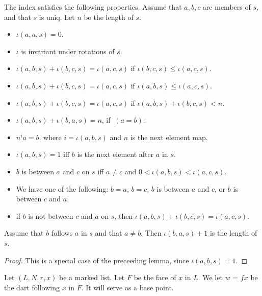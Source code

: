 \begin{lemma}
The index satisfies the following properties.  Assume
that $a,b,c$ are members of $s$, and that $s$ is uniq.  Let $n$ be the length of $s$.
\begin{itemize}
\item $\iota(a,a,s)=0$.
\item $\iota$ is invariant under rotations of $s$.
\item $\iota(a,b,s) + \iota(b,c,s) = \iota(a,c,s)$ if $\iota(b,c,s)\le \iota(a,c,s)$.
\item $\iota(a,b,s) + \iota(b,c,s) = \iota(a,c,s)$ if $\iota(a,b,s)\le \iota(a,c,s)$.
\item $\iota(a,b,s) + \iota(b,c,s) = \iota(a,c,s)$ if $\iota(a,b,s)+\iota(b,c,s) < n$.
\item $\iota(a,b,s) + \iota(b,a,s) = n$, if $~(a=b)$.
\item $n^i a = b$, where $i=\iota(a,b,s)$ and $n$ is the next element map.
\item $\iota(a,b,s)=1$ iff $b$ is the next element after $a$ in $s$.
\item $b$ is between $a$ and $c$ on $s$ iff $a\ne c$ and $0 < \iota(a,b,s) < \iota(a,c,s)$.
\item We have one of the following: $b=a$, $b=c$, $b$ is between $a$ and $c$, or $b$ is between $c$ and $a$.
\item if $b$ is not between $c$ and $a$ on $s$, then $\iota(a,b,s) + \iota(b,c,s) = \iota(a,c,s)$.
\end{itemize}
\end{lemma}

\begin{lemma}
   Assume that $b$ follows $a$ in $s$ and that $a\ne b$. Then
$\iota(b,a,s) + 1$ is the length of $s$.
\end{lemma}

\begin{proof} This is a special case of the preceeding lemma, since $\iota(a,b,s)=1$.
\end{proof}


Let $(L,N,r,x)$ be a marked list.  Let $F$ be the face of $x$ in $L$.
 We let $w$ = $f x$ be the dart following $x$ in $F$.  It will serve
as a base point.

